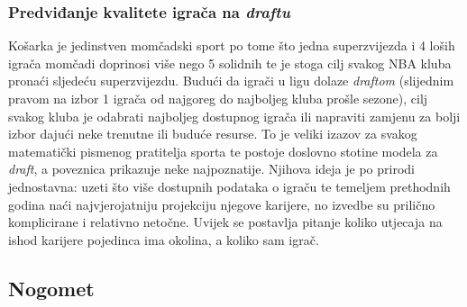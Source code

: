 \documentclass{ferseminar}
\begin{document}
\subsubsection{Predviđanje kvalitete igrača na \textit{draftu}}
Košarka je jedinstven momčadski sport po tome što jedna superzvijezda i 4 loših igrača momčadi doprinosi više nego 5 solidnih te je stoga cilj svakog NBA kluba pronaći sljedeću superzvijezdu. Budući da igrači u ligu dolaze \textit{draftom} (slijednim pravom na izbor 1 igrača od najgoreg do najboljeg kluba prošle sezone), cilj svakog kluba je odabrati najboljeg dostupnog igrača ili napraviti zamjenu za bolji izbor dajući neke trenutne ili buduće resurse. To je veliki izazov za svakog matematički pismenog pratitelja sporta te postoje doslovno stotine modela za \textit{draft}, a poveznica prikazuje neke najpoznatije. \cite{models}
\newline
Njihova ideja je po prirodi jednostavna: uzeti što više dostupnih podataka o igraču te temeljem prethodnih godina naći najvjerojatniju projekciju njegove karijere, no izvedbe su prilično komplicirane i relativno netočne. Uvijek se postavlja pitanje koliko utjecaja na ishod karijere pojedinca ima okolina, a koliko sam igrač.

\subsection{Nogomet}
\end{document}
